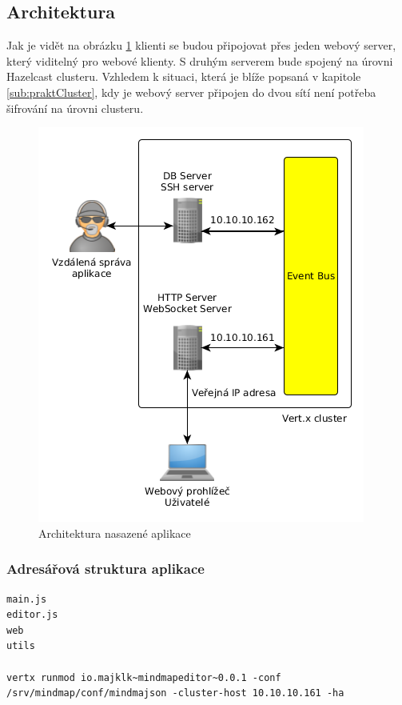 \FloatBarrier

\subsection{Architektura}

Jak je vidět na obrázku \ref{fig:architecture_real} klienti se budou připojovat přes jeden webový server, který viditelný pro webové klienty. S druhým serverem bude spojený na úrovni Hazelcast clusteru. Vzhledem k situaci, která je blíže popsaná v kapitole \ref{sub:praktCluster}, kdy je webový server připojen do dvou sítí není potřeba šifrování na úrovni clusteru.

\begin{figure}
\begin{centering}
\includegraphics[scale=0.5]{obrazky/architecture_real}
\par\end{centering}
\caption{Architektura nasazené aplikace\label{fig:architecture_real}}
\end{figure}

\subsubsection{Adresářová struktura aplikace}

\begin{lstlisting}
main.js
editor.js
web
utils

vertx runmod io.majklk~mindmapeditor~0.0.1 -conf /srv/mindmap/conf/mindmajson -cluster-host 10.10.10.161 -ha
\end{lstlisting}



